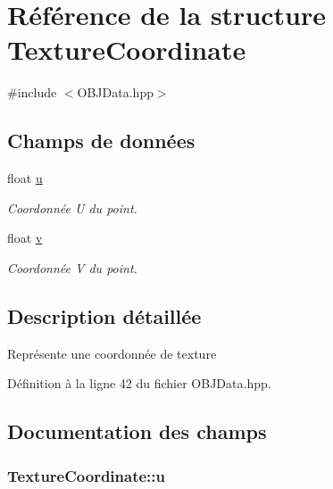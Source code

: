 \hypertarget{structTextureCoordinate}{\section{Référence de la structure Texture\+Coordinate}
\label{structTextureCoordinate}
}


{\ttfamily \#include $<$O\+B\+J\+Data.\+hpp$>$}

\subsection*{Champs de données}
\begin{DoxyCompactItemize}
\item 
float \hyperlink{structTextureCoordinate_a7ae310180120a5fc2aafaae29a85c68e}{u}
\begin{DoxyCompactList}\small\item\em Coordonnée U du point. \end{DoxyCompactList}\item 
float \hyperlink{structTextureCoordinate_a894c1bf1a27da48a276e5fe7bba6e200}{v}
\begin{DoxyCompactList}\small\item\em Coordonnée V du point. \end{DoxyCompactList}\end{DoxyCompactItemize}


\subsection{Description détaillée}
Représente une coordonnée de texture 

Définition à la ligne 42 du fichier O\+B\+J\+Data.\+hpp.



\subsection{Documentation des champs}
\hypertarget{structTextureCoordinate_a7ae310180120a5fc2aafaae29a85c68e}{
\subsubsection[{u}]{\setlength{\rightskip}{0pt plus 5cm}Texture\+Coordinate\+::u}}\label{structTextureCoordinate_a7ae310180120a5fc2aafaae29a85c68e}


